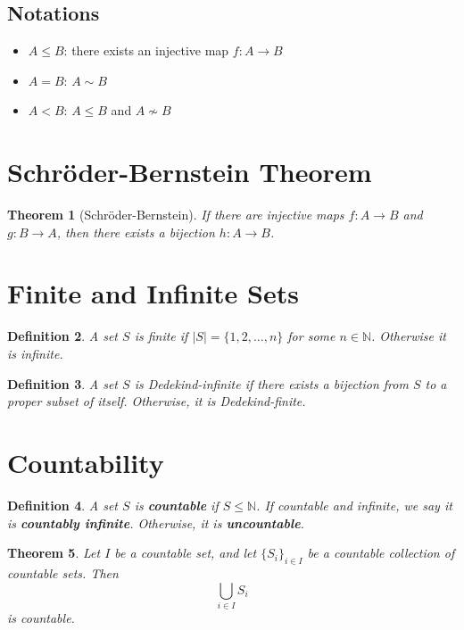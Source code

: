 \documentclass{article}
\newtheorem{theorem}{Theorem}[section]
\newtheorem{definition}[theorem]{Definition}
\begin{document}
\subsection*{Notations}
\begin{itemize}
    \item \( A \leq B \): there exists an injective map \( f: A \to B \)
    \item \( A = B \): \( A \sim B \)
    \item \( A < B \): \( A \leq B \) and \( A \not\sim B \)
\end{itemize}

\section{Schröder-Bernstein Theorem}

\begin{theorem}[Schröder-Bernstein]
If there are injective maps \( f : A \to B \) and \( g : B \to A \), then there exists a bijection \( h : A \to B \).
\end{theorem}

\section{Finite and Infinite Sets}

\begin{definition}
A set \( S \) is finite if \( |S| = \{1, 2, \dots, n\} \) for some \( n \in \mathbb{N} \). Otherwise it is infinite.
\end{definition}

\begin{definition}
A set \( S \) is Dedekind-infinite if there exists a bijection from \( S \) to a proper subset of itself. Otherwise, it is Dedekind-finite.
\end{definition}

\section{Countability}

\begin{definition}
A set \( S \) is \textbf{countable} if \( S \leq \mathbb{N} \). If countable and infinite, we say it is \textbf{countably infinite}. Otherwise, it is \textbf{uncountable}.
\end{definition}

\begin{theorem}
Let \( I \) be a countable set, and let \( \{S_i\}_{i \in I} \) be a countable collection of countable sets. Then
\[
\bigcup_{i \in I} S_i
\]
is countable.
\end{theorem}
\end{document}
